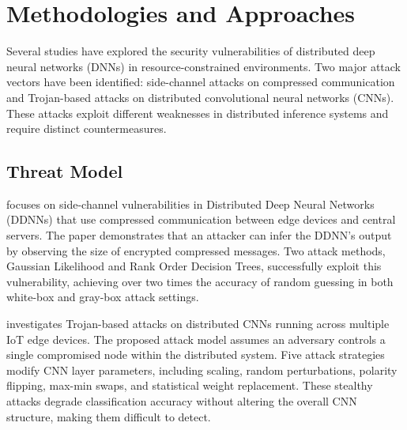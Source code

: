 \documentclass[conference]{IEEEtran}
\begin{document}






\section{Methodologies and Approaches}

Several studies have explored the security vulnerabilities of distributed deep neural networks (DNNs) in resource-constrained environments. Two major attack vectors have been identified: side-channel attacks on compressed communication and Trojan-based attacks on distributed convolutional neural networks (CNNs). These attacks exploit different weaknesses in distributed inference systems and require distinct countermeasures.

\subsection{Threat Model}
\cite{kannan2024security} focuses on side-channel vulnerabilities in Distributed Deep Neural Networks (DDNNs) that use compressed communication between edge devices and central servers. The paper demonstrates that an attacker can infer the DDNN’s output by observing the size of encrypted compressed messages. Two attack methods, Gaussian Likelihood and Rank Order Decision Trees, successfully exploit this vulnerability, achieving over two times the accuracy of random guessing in both white-box and gray-box attack settings.

\cite{mohammed2020secure} investigates Trojan-based attacks on distributed CNNs running across multiple IoT edge devices. The proposed attack model assumes an adversary controls a single compromised node within the distributed system. Five attack strategies modify CNN layer parameters, including scaling, random perturbations, polarity flipping, max-min swaps, and statistical weight replacement. These stealthy attacks degrade classification accuracy without altering the overall CNN structure, making them difficult to detect.
\end{document}
